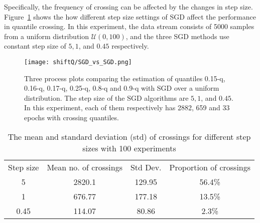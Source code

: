 Specifically, the frequency of crossing can be affected by the changes in step size. Figure~\ref{fig: SGD_SGD} shows the how different step size settings of SGD affect the performance in quantile crossing. In this experiment, the data stream consists of 5000 samples from a uniform distribution $\mathcal{U}(0,100)$, and the three SGD methods use constant step size of $5, 1$, and $0.45$ respectively. 
    \begin{figure}[h!]
        \texttt{[image: shiftQ/SGD\_vs\_SGD.png]}
        \caption{Three process plots comparing the estimation of quantiles 0.15-q, 0.16-q, 0.17-q, 0.25-q, 0.8-q and 0.9-q with SGD over a uniform distribution. The step size of the SGD algorithms are $5, 1$, and $0.45$. In this experiment, each of them respectively has 2882, 659 and 33 epochs with crossing quantiles.}
        \label{fig: SGD_SGD}
    \end{figure}

    \begin{table}[h!]
        \centering
        \caption{The mean and standard deviation (std) of crossings for different step sizes with 100 experiments}
        \begin{tabular}{cccc}
        \toprule
        Step size & Mean no. of crossings   & Std Dev.              & Proportion of crossings\\ 
        5         & 2820.1                  & 129.95                            & 56.4\%                 \\
        1         & 676.77                  & 177.18                            & 13.5\%                 \\
        0.45      & 114.07                  & 80.86                             & 2.3\%      \\
        \bottomrule
        \end{tabular}
        \label{tab: SGD_SGD}
    \end{table}

